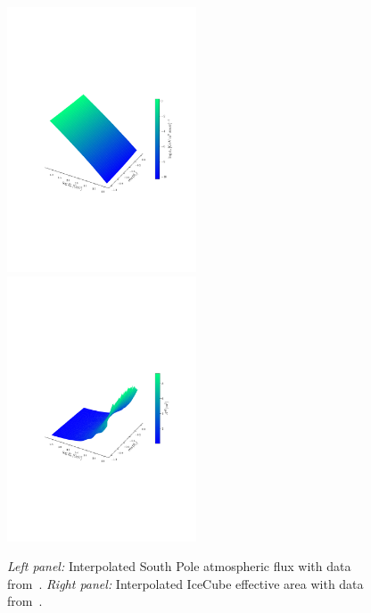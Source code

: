 \begin{figure}[t]\label{fig:flux_aeff}
    \includegraphics[width=0.5\textwidth]{figures/flux.pdf}\hspace{-1cm}
    \includegraphics[width=0.5\textwidth]{figures/aeff.pdf}
    \vspace{-2.5cm}\caption{\emph{Left panel:} Interpolated South Pole atmospheric flux with data from~\cite{hondaArticle}.
    \emph{Right panel:} Interpolated IceCube effective area with data from~\cite{ICaeff}.}
\end{figure}


